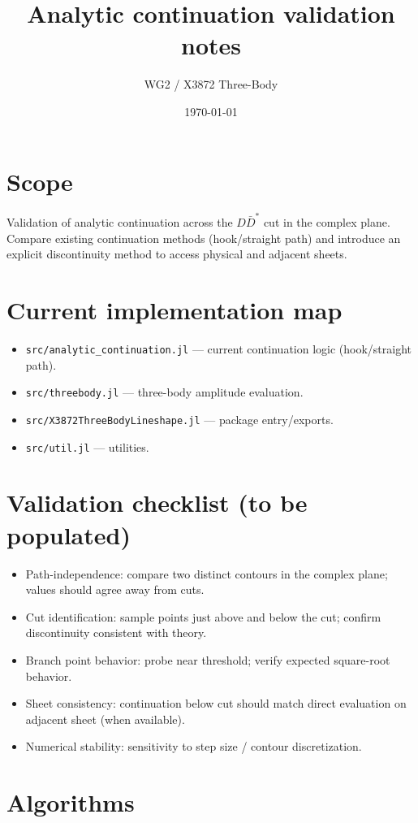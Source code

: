 \documentclass{article}
\title{Analytic continuation validation notes}
\author{WG2 / X3872 Three-Body}
\date{\today}
\begin{document}
\maketitle

\section*{Scope}
Validation of analytic continuation across the $D\bar D^*$ cut in the complex plane. Compare existing continuation methods (hook/straight path) and introduce an explicit discontinuity method to access physical and adjacent sheets.

\section*{Current implementation map}
\begin{itemize}
  \item \texttt{src/analytic\_continuation.jl} — current continuation logic (hook/straight path).
  \item \texttt{src/threebody.jl} — three-body amplitude evaluation.
  \item \texttt{src/X3872ThreeBodyLineshape.jl} — package entry/exports.
  \item \texttt{src/util.jl} — utilities.
\end{itemize}

\section*{Validation checklist (to be populated)}
\begin{itemize}
  \item Path-independence: compare two distinct contours in the complex plane; values should agree away from cuts.
  \item Cut identification: sample points just above and below the cut; confirm discontinuity consistent with theory.
  \item Branch point behavior: probe near threshold; verify expected square-root behavior.
  \item Sheet consistency: continuation below cut should match direct evaluation on adjacent sheet (when available).
  \item Numerical stability: sensitivity to step size / contour discretization.
\end{itemize}

\section*{Algorithms}
\end{document}
